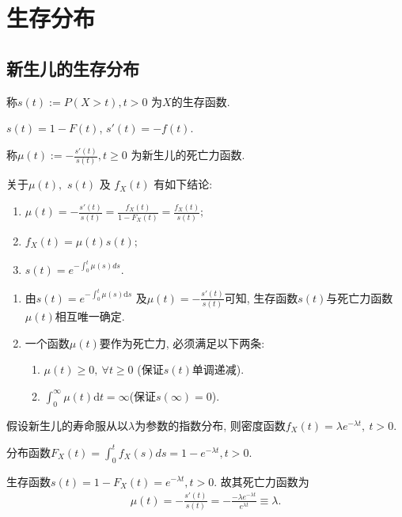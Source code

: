 \documentclass[lang=cn,10pt]{elegantbook}
\begin{document}
\chapter{生存分布}

\section{新生儿的生存分布}

\begin{definition}[生存函数]
  称$s(t):=P(X>t),t>0$ 为$X$的生存函数.
\end{definition}

\begin{corollary}
  $s(t)=1-F(t)$, $s'(t)=-f(t)$.
\end{corollary}

\begin{definition}[死亡力函数]
  称$\mu(t):=-\frac{s'(t)}{s(t)},t\ge 0$ 为新生儿的死亡力函数.
\end{definition}

\begin{corollary} 关于$\mu(t),$ $s(t)$ 及 $f_X(t)$ 有如下结论:
\begin{enumerate}
	\item $\mu(t)=-\frac{s'(t)}{s(t)}=\frac{f_X(t)}{1-F_X(t)}=\frac{f_X(t)}{s(t)};$
	\item $f_X(t)=\mu(t)s(t);$
	\item $s(t)=e^{-\int_0^t\mu(s)ds}.$
\end{enumerate}
\end{corollary}

\begin{remark}
    \begin{enumerate}
        \item 由$s(t) = e^{-\int_{0}^{t}\mu(s)\mathrm{d}s}$ 及$ \mu(t) = -\frac{s'(t)}{s(t)}$可知, 生存函数$s(t)$与死亡力函数$\mu(t)$相互唯一确定.
        \item 一个函数$\mu(t)$要作为死亡力, 必须满足以下两条:
            \begin{enumerate}
                \item $\mu(t) \geq 0, ~\forall t \geq 0$ (保证$s(t)$单调递减).
                \item $\int_0^{\infty}\mu(t)\mathrm{d}t = \infty$(保证$s(\infty)=0$).
            \end{enumerate}
    \end{enumerate}
\end{remark}

\begin{example}
    假设新生儿的寿命服从以$\lambda$为参数的指数分布, 则密度函数$f_X(t)=\lambda e^{-\lambda t},~t>0.$
\end{example}
\begin{solution}
	分布函数$F_X(t)=\int_0^t f_X(s)ds=1-e^{-\lambda t}, t>0.$ 
	
	生存函数$s(t)=1-F_X(t)=e^{-\lambda t},t>0.$  故其死亡力函数为
    \begin{align}\label{ep}
        \mu(t)=-\frac{s'(t)}{s(t)}=-\frac{-\lambda e^{-\lambda t}}{e^{\lambda t}}\equiv\lambda.
    \end{align}
\end{solution}
\end{document}
